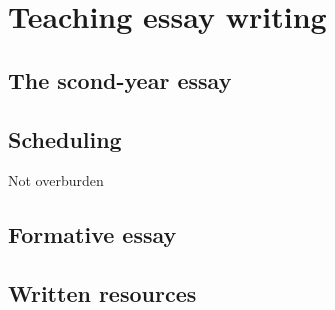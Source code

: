 \chapter{Teaching essay writing}\label{ch:essay}

\section{The scond-year essay}

\section{Scheduling}\label{sec:timetable}

Not overburden

\section{Formative essay}

\section{Written resources}
